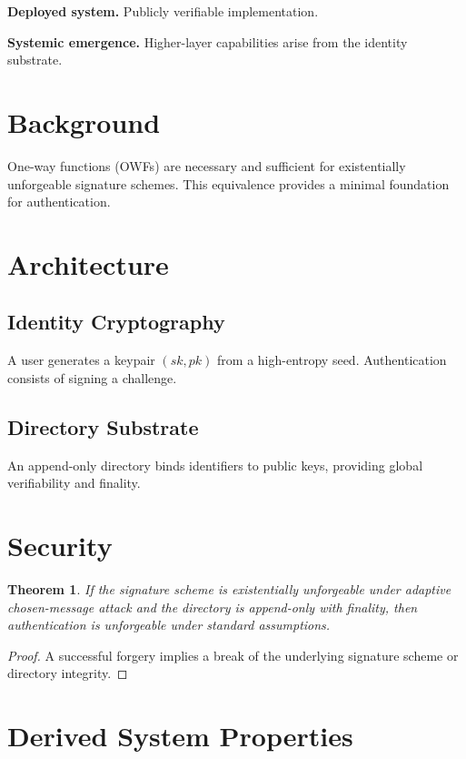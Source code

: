 \documentclass[11pt,a4paper]{article}
\newtheorem{theorem}{Theorem}[section]
\begin{document}
\textbf{Deployed system.} Publicly verifiable implementation.

\textbf{Systemic emergence.} Higher-layer capabilities arise from the identity substrate.

\section{Background}

One-way functions (OWFs) are necessary and sufficient for existentially unforgeable signature schemes. This equivalence provides a minimal foundation for authentication.

\section{Architecture}

\subsection{Identity Cryptography}

A user generates a keypair $(sk, pk)$ from a high-entropy seed. Authentication consists of signing a challenge.

\subsection{Directory Substrate}

An append-only directory binds identifiers to public keys, providing global verifiability and finality.

\section{Security}

\begin{theorem}
If the signature scheme is existentially unforgeable under adaptive chosen-message attack and the directory is append-only with finality, then authentication is unforgeable under standard assumptions.
\end{theorem}

\begin{proof}
A successful forgery implies a break of the underlying signature scheme or directory integrity.
\end{proof}

\section{Derived System Properties}
\end{document}
